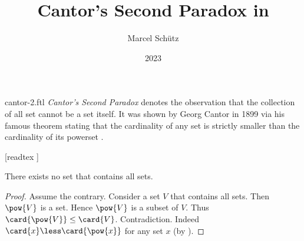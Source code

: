\documentclass{stex}
\begin{document}
\title{Cantor's Second Paradox in \Naproche}
\author{Marcel Schütz}
\date{2023}
\maketitle
\begin{smodule}{cantor-2.ftl}
  \noindent \emph{Cantor's Second Paradox} denotes the observation that the collection of all set cannot be a set itself.
  It was shown by Georg Cantor in 1899 via his famous theorem stating that the cardinality of any set is strictly smaller than the cardinality of its powerset \cite[chapter 163]{Cantor1991}.

  \begin{forthel}
    [readtex ]
  \end{forthel}

  \begin{forthel}
    \begin{theorem*}\label{cantor_paradox_2}
      There exists no set that contains all sets.
    \end{theorem*}
    \begin{proof}
      Assume the contrary.
      Consider a set $V$ that contains all sets.
      Then $\pow{V}$ is a set.
      Hence $\pow{V}$ is a subset of $V$.
      Thus $\card{\pow{V}} \leq \card{V}$.
      Contradiction.
      Indeed $\card{x} \less \card{\pow{x}}$ for any set $x$ (by ).
    \end{proof}
  \end{forthel}
\end{smodule}
\printbibliography
\end{document}
